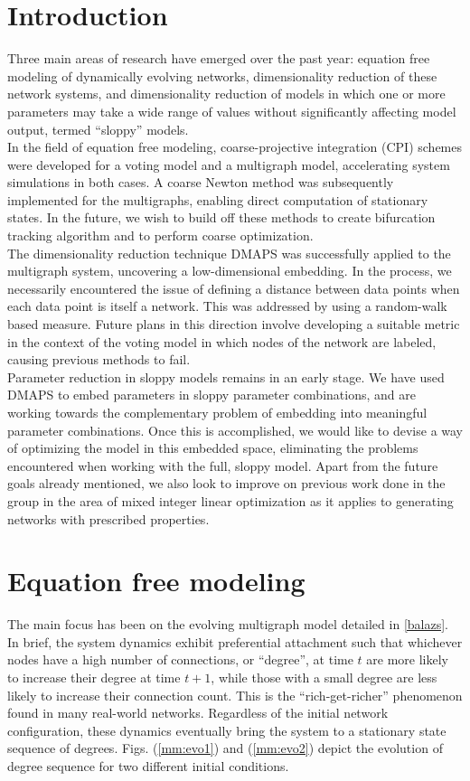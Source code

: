 \documentclass[12pt]{article}
\begin{document}
\section{Introduction}
  Three main areas of research have emerged over the past year: equation free modeling of dynamically evolving networks, dimensionality reduction of these network systems, and dimensionality reduction of models in which one or more parameters may take a wide range of values without significantly affecting model output, termed ``sloppy'' models. \\
  In the field of equation free modeling, coarse-projective integration (CPI) schemes were developed for a voting model and a multigraph model, accelerating system simulations in both cases. A coarse Newton method was subsequently implemented for the multigraphs, enabling direct computation of stationary states. In the future, we wish to build off these methods to create bifurcation tracking algorithm and to perform coarse optimization. \\
  The dimensionality reduction technique DMAPS was successfully applied to the multigraph system, uncovering a low-dimensional embedding. In the process, we necessarily encountered the issue of defining a distance between data points when each data point is itself a network. This was addressed by using a random-walk based measure. Future plans in this direction involve developing a suitable metric in the context of the voting model in which nodes of the network are labeled, causing previous methods to fail. \\
  Parameter reduction in sloppy models remains in an early stage. We have used DMAPS to embed parameters in sloppy parameter combinations, and are working towards the complementary problem of embedding into meaningful parameter combinations. Once this is accomplished, we would like to devise a way of optimizing the model in this embedded space, eliminating the problems encountered when working with the full, sloppy model.
  Apart from the future goals already mentioned, we also look to improve on previous work done in the group in the area of mixed integer linear optimization as it applies to generating networks with prescribed properties.

\section{Equation free modeling}
The main focus has been on the evolving multigraph model detailed in \ref{balazs}. In brief, the system dynamics exhibit preferential attachment such that whichever nodes have a high number of connections, or ``degree'', at time $t$ are more likely to increase their degree at time $t+1$, while those with a small degree are less likely to increase their connection count. This is the ``rich-get-richer'' phenomenon found in many real-world networks. Regardless of the initial network configuration, these dynamics eventually bring the system to a stationary state sequence of degrees. Figs. (\ref{mm:evo1}) and (\ref{mm:evo2}) depict the evolution of degree sequence for two different initial conditions. 
\end{document}
